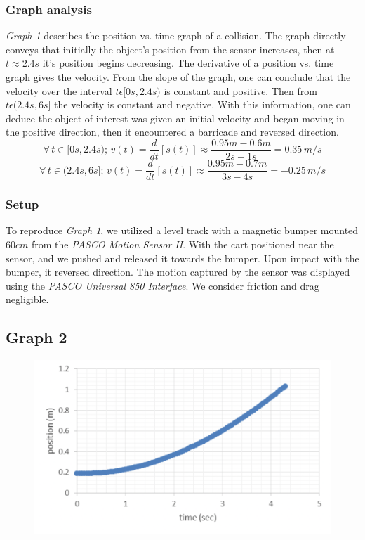 \documentclass[11pt, letterpaper, includehead]{article}
\begin{document}
  \subsubsection{Graph analysis}
  \emph{Graph 1} describes the position vs. time graph of a collision.
  The graph directly conveys that initially the object's position from 
  the sensor increases, then at $t\approx2.4s$ it's position begins decreasing. 
  The derivative of a position vs. time graph gives the velocity. From the slope 
  of the graph, one can conclude that the velocity over the interval $t\epsilon[0s, 2.4s)$
  is constant and positive. Then from $t \epsilon (2.4s, 6s]$ the velocity is constant 
  and negative. With this information, one can deduce the object of interest was given 
  an initial velocity and began moving in the positive direction, then it encountered 
  a barricade and reversed direction.
  $$\forall \, t \in [0s, 2.4s); \, v(t) = \frac{d}{dt}[s(t)] \approx \frac{0.95m - 0.6m}{2s - 1s} = 0.35 \, m/s$$
  $$\forall \, t \in (2.4s, 6s]; \, v(t) = \frac{d}{dt}[s(t)] \approx \frac{0.95m - 0.7m}{3s - 4s} = -0.25 \, m/s$$

  \subsubsection{Setup}
  To reproduce \emph{Graph 1}, we utilized a level track with a magnetic bumper mounted $60cm$ 
  from the \emph{PASCO Motion Sensor II}. With the cart positioned near the sensor, and we 
  pushed and released it towards the bumper. Upon impact with the bumper, it reversed 
  direction. The motion captured by the sensor was displayed using the \emph{PASCO Universal 
  850 Interface}. We consider friction and drag negligible. \\

  \subsection{Graph 2}

  \begin{figure}[H] %
    \centering 
    \includegraphics[width=\linewidth]{graph_2.png}
  \end{figure}
\end{document}
